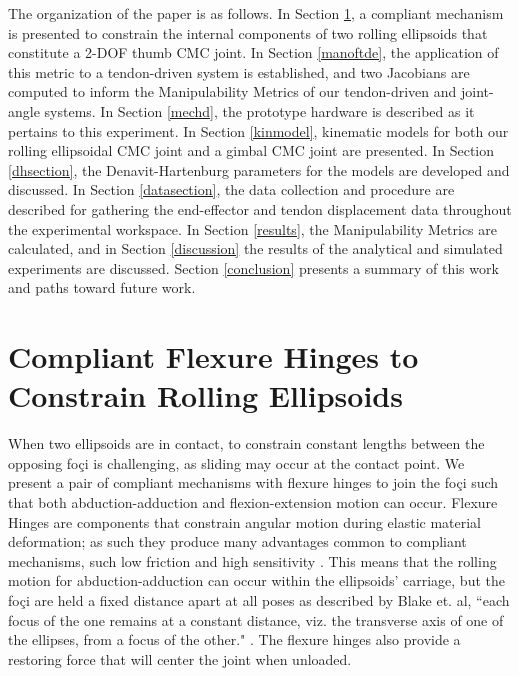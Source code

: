 \documentclass[journal]{IEEEtran}
\begin{document}
The organization of the paper is as follows. In Section \ref{flexhinge}, a compliant mechanism is presented to constrain the internal components of two rolling ellipsoids that constitute a 2-DOF thumb CMC joint. In Section \ref{manoftde}, the application of this metric to a tendon-driven system is established, and two Jacobians are computed to inform the Manipulability Metrics of our tendon-driven and joint-angle systems. In Section \ref{mechd}, the prototype hardware is described as it pertains to this experiment. In Section \ref{kinmodel}, kinematic models for both our rolling ellipsoidal CMC joint and a gimbal CMC joint are presented. In Section \ref{dhsection}, the Denavit-Hartenburg parameters for the models are developed and discussed. In Section \ref{datasection}, the data collection and procedure are described for gathering the end-effector and tendon displacement data throughout the experimental workspace. In Section \ref{results}, the Manipulability Metrics are calculated, and in Section \ref{discussion} the results of the analytical and simulated experiments are discussed. Section \ref{conclusion} presents a summary of this work and paths toward future work.





\section{Compliant Flexure Hinges to Constrain Rolling Ellipsoids}

\label{flexhinge}

When two ellipsoids are in contact, to constrain constant lengths between the opposing foçi is challenging, as sliding may occur at the contact point. We present a pair of compliant mechanisms with flexure hinges to join the foçi such that both abduction-adduction and flexion-extension motion can occur. Flexure Hinges are components that constrain angular motion during elastic material deformation; as such they produce many advantages common to compliant mechanisms, such low friction and high sensitivity \cite{fhdef}. This means that the rolling motion for abduction-adduction can occur within the ellipsoids' carriage, but the foçi are held a fixed distance apart at all poses as described by Blake et. al, ``each focus of the one remains at a constant distance, viz. the transverse axis of one of the ellipses, from a focus of the other." \cite{Blake}. The flexure hinges also provide a restoring force that will center the joint when unloaded.
\end{document}
